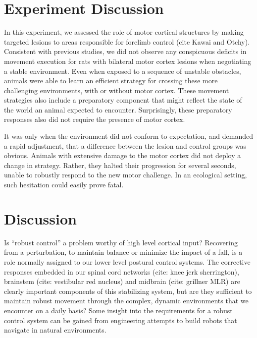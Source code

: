 \section{Experiment Discussion}

In this experiment, we assessed the role of motor cortical structures by making targeted lesions to areas responsible for forelimb control (cite Kawai and Otchy). Consistent with previous studies, we did not observe any conspicuous deficits in movement execution for rats with bilateral motor cortex lesions when negotiating a stable environment. Even when exposed to a sequence of unstable obstacles, animals were able to learn an efficient strategy for crossing these more challenging environments, with or without motor cortex. These movement strategies also include a preparatory component that might reflect the state of the world an animal expected to encounter. Surprisingly, these preparatory responses also did not require the presence of motor cortex.

It was only when the environment did not conform to expectation, and demanded a rapid adjustment, that a difference between the lesion and control groups was obvious. Animals with extensive damage to the motor cortex did not deploy a change in strategy. Rather, they halted their progression for several seconds, unable to robustly respond to the new motor challenge. In an ecological setting, such hesitation could easily prove fatal.

\section{Discussion}

Is ``robust control'' a problem worthy of high level cortical input? Recovering from a perturbation, to maintain balance or minimize the impact of a fall, is a role normally assigned to our lower level postural control systems. The corrective responses embedded in our spinal cord networks (cite: knee jerk sherrington), brainstem (cite: vestibular red nucleus) and midbrain (cite: grillner MLR) are clearly important components of this stabilizing system, but are they sufficient to maintain robust movement through the complex, dynamic environments that we encounter on a daily basis? Some insight into the requirements for a robust control system can be gained from engineering attempts to build robots that navigate in natural environments.

